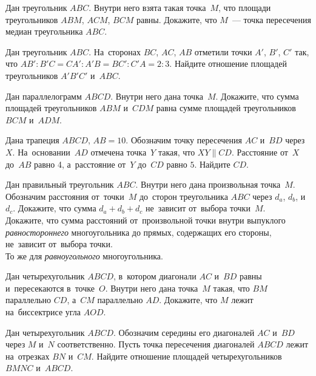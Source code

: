 


\begin{problems}

\item
Дан треугольник $ABC$.
Внутри него взята такая точка~$M$, что площади треугольников
$ABM$, $ACM$, $BCM$ равны.
Докажите, что $M$~--- точка пересечения медиан треугольника $ABC$.

\item
Дан треугольник $ABC$.
На~сторонах $BC$, $AC$, $AB$ отметили точки $A'$, $B'$, $C'$ так, что
$AB' : B'C = CA' : A'B = BC' : C'A = 2 : 3$.
Найдите отношение площадей треугольников $A'B'C'$ и~$ABC$.

\item
Дан параллелограмм $ABCD$.
Внутри него дана точка~$M$.
Докажите, что сумма площадей треугольников $ABM$ и~$CDM$ равна сумме площадей
треугольников $BCM$ и~$ADM$.

\item
Дана трапеция $ABCD$, $AB = 10$.
Обозначим точку пересечения $AC$ и~$BD$ через $X$.
На~основании~$AD$ отмечена точка~$Y$ такая, что $XY \parallel CD$.
Расстояние от~$X$ до~$AB$ равно 4, а~расстояние от~$Y$ до~$CD$ равно $5$.
Найдите $CD$.

\item
\subproblem
Дан правильный треугольник $ABC$.
Внутри него дана произвольная точка~$M$.
Обозначим расстояния от~точки~$M$ до~сторон треугольника $ABC$ через
$d_{a}$, $d_{b}$, и~$d_{c}$.
Докажите, что сумма $d_{a} + d_{b} + d_{c}$ не~зависит от~выбора точки~$M$.
\\
\subproblem
Докажите, что сумма расстояний от~произвольной точки внутри выпуклого
\emph{равностороннего} многоугольника до прямых, содержащих его стороны,
не~зависит от~выбора точки.
\\
\subproblem
То же для \emph{равноугольного} многоугольника.

\item
Дан четырехугольник $ABCD$, в~котором диагонали $AC$ и~$BD$ равны
и~пересекаются в~точке~$O$.
Внутри него дана точка~$M$ такая, что $BM$ параллельно $CD$, а~$CM$
параллельно $AD$.
Докажите, что $M$ лежит на~биссектрисе угла $AOD$.

\item
Дан четырехугольник $ABCD$.
Обозначим середины его диагоналей $AC$ и~$BD$ через $M$ и~$N$ соответственно.
Пусть точка пересечения диагоналей $ABCD$ лежит на~отрезках $BN$ и~$CM$.
Найдите отношение площадей четырехугольников $BMNC$ и~$ABCD$.


\end{problems}
